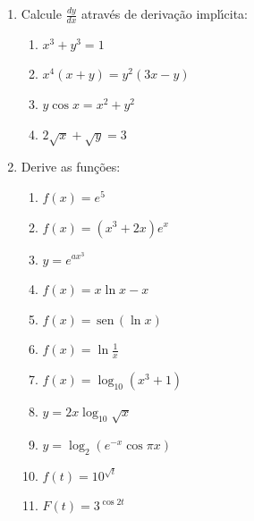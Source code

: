 \documentclass[a4paper,5pt]{amsbook}
\newcommand{\sen}{\,\mbox{sen}\,}
\newcommand{\ds}{\displaystyle}
\begin{document}
\begin{enumerate}
    \vspace{0.5cm}
    \item Calcule $\ds\frac{dy}{dx}$ atrav\'es de deriva\c{c}\~ao impl\'{\i}cita:
        \begin{enumerate}
            \vspace{0.3cm}
            \item $x^3+y^3=1$
            \vspace{0.3cm}
            \item $x^4(x+y)=y^2(3x-y)$
            \vspace{0.3cm}
            \item $y\cos{x}=x^2+y^2$
            \vspace{0.3cm}
            \item $2\sqrt{x} + \sqrt{y}=3$
        \end{enumerate}

    \vspace{0.5cm}
    \item Derive as fun\c{c}\~oes:
        \begin{enumerate}
            \vspace{0.3cm}
            \item $f(x)=e^5$
            \vspace{0.3cm}
            \item $f(x)=(x^3+2x)e^x$
            \vspace{0.3cm}
            \item $y=e^{ax^3}$
            \vspace{0.3cm}
            \item $f(x)=x\ln{x}-x$
            \vspace{0.3cm}
            \item $f(x)=\sen{(\ln{x})}$
            \vspace{0.3cm}
            \item $f(x)=\ln{\ds\frac{1}{x}}$
            \vspace{0.3cm}
            \item $f(x)=\log_{10}(x^3+1)$
            \vspace{0.3cm}
            \item $y=2x\log_{10}\sqrt{x}$
            \vspace{0.3cm}
            \item $y=\log_2(e^{-x}\cos{\pi x})$
            \vspace{0.3cm}
            \item $f(t)=10^{\sqrt{t}}$
            \vspace{0.3cm}
            \item $F(t)=3^{\cos{2t}}$
        \end{enumerate}
\end{enumerate}
\end{document}
